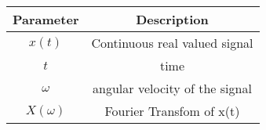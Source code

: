 \renewcommand{\arraystretch}{1.5}
\begin{tabular}{|c|c|}
\hline
Parameter & Description  \\\hline
\( x(t) \) & Continuous real valued signal  \\\hline
\(t \) & time \\\hline
\(\omega \) & angular velocity of the signal \\\hline
\(X(\omega)\)& Fourier Transfom of x(t)\\\hline
\end{tabular}
